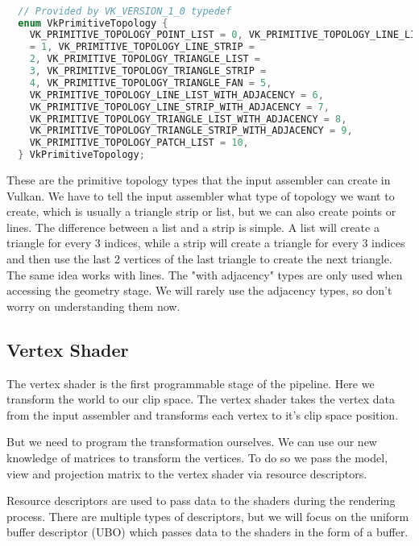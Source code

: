 \documentclass[12pt]{report} \usepackage{preamble}
\begin{document}
\newpage

\begin{lstlisting}[language=C++] 

  // Provided by VK_VERSION_1_0 typedef
  enum VkPrimitiveTopology {
    VK_PRIMITIVE_TOPOLOGY_POINT_LIST = 0, VK_PRIMITIVE_TOPOLOGY_LINE_LIST
    = 1, VK_PRIMITIVE_TOPOLOGY_LINE_STRIP =
    2, VK_PRIMITIVE_TOPOLOGY_TRIANGLE_LIST =
    3, VK_PRIMITIVE_TOPOLOGY_TRIANGLE_STRIP =
    4, VK_PRIMITIVE_TOPOLOGY_TRIANGLE_FAN = 5,
    VK_PRIMITIVE_TOPOLOGY_LINE_LIST_WITH_ADJACENCY = 6,
    VK_PRIMITIVE_TOPOLOGY_LINE_STRIP_WITH_ADJACENCY = 7,
    VK_PRIMITIVE_TOPOLOGY_TRIANGLE_LIST_WITH_ADJACENCY = 8,
    VK_PRIMITIVE_TOPOLOGY_TRIANGLE_STRIP_WITH_ADJACENCY = 9,
    VK_PRIMITIVE_TOPOLOGY_PATCH_LIST = 10,
  } VkPrimitiveTopology; 
  \end{lstlisting} \cite{vulkan-spec-primitive-topology}

These are the primitive topology types that the input assembler can
create in Vulkan.  We have to tell the input assembler what type of
topology we want to create, which is usually a triangle strip or list,
but we can also create points or lines.  The difference between a list
and a strip is simple. A list will create a triangle for every 3 indices,
while a strip will create a triangle for every 3 indices and then use
the last 2 vertices of the last triangle to create the next triangle.
The same idea works with lines. The "with adjacency" types are only
used when accessing the geometry stage. We will rarely use
the adjacency types, so don't worry on understanding them now. \cite{vulkan-spec-primitive-topology}

\subsection{Vertex Shader}

The vertex shader is the first programmable stage of the pipeline.
Here we transform the world to our clip space. The vertex shader takes
the vertex data from the input assembler and transforms each vertex
to it's clip space position. \cite{vulkan-tutorial-shader-modules}

But we need to program the transformation ourselves. We can use our new
knowledge of matrices to transform the vertices. To do so we pass the
model, view and projection matrix to the vertex shader via resource descriptors.

Resource descriptors are used to pass data to the shaders during the
rendering process. There are multiple types of descriptors, but we will
focus on the uniform buffer descriptor (UBO) which passes data to the shaders
in the form of a buffer.
\end{document}
